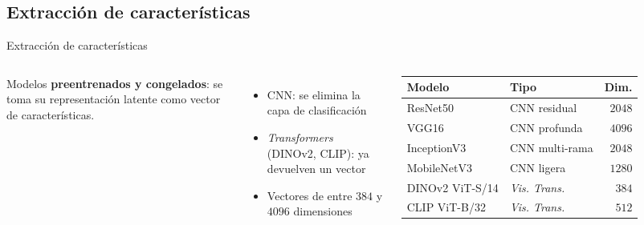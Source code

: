 \documentclass[aspectratio=1610]{beamer}
\begin{document}
\subsection{Extracción de características}
\begin{frame}{Extracción de características}
  \begin{columns}
      Modelos \textbf{preentrenados y congelados}: se toma su representación latente como vector de características.
      \vspace{0.6em}
      \begin{itemize}
        \item CNN: se elimina la capa de clasificación
        \item \textit{Transformers} (DINOv2, CLIP): ya devuelven un vector
        \item Vectores de entre $384$ y $4096$ dimensiones
      \end{itemize}
      \centering \small
      \begin{tabular}{llr}
        \toprule
        \textbf{Modelo} & \textbf{Tipo} & \textbf{Dim.} \\
        \midrule
        ResNet50      & CNN residual      & $2048$ \\
        VGG16         & CNN profunda      & $4096$ \\
        InceptionV3   & CNN multi-rama    & $2048$ \\
        MobileNetV3   & CNN ligera        & $1280$ \\
        DINOv2 ViT-S/14 & \textit{Vis. Trans.} & $384$ \\
        CLIP ViT-B/32 & \textit{Vis. Trans.} & $512$ \\
        \bottomrule
      \end{tabular}
  \end{columns}
\end{frame}
\end{document}

